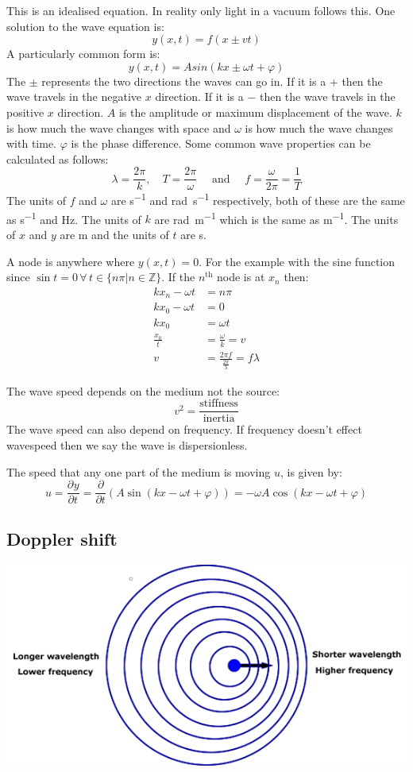 \documentclass{article}
\newcommand{\pd}[3][]{\frac{\partial^{#1}{#2}}{\partial{#3}^{#1}}}
\newcommand{\A}{\forall\,}
\newcommand{\bb}[1]{\mathbb{#1}}
\newcounter{example}[section]
\begin{document}
This is an idealised equation. In reality only light in a vacuum follows this. One solution to the wave equation is:
\[y(x,t)=f(x\pm vt)\]
A particularly common form is:
\[y(x,t)=Asin(kx\pm\omega t+\varphi)\]
The \(\pm\) represents the two directions the waves can go in. If it is a \(+\) then the wave travels in the negative \(x\) direction. If it is a \(-\) then the wave travels in the positive \(x\) direction. \(A\) is the amplitude or maximum displacement of the wave. \(k\) is how much the wave changes with space and \(\omega\) is how much the wave changes with time. \(\varphi\) is the phase difference. Some common wave properties can be calculated as follows:
\[\lambda=\frac{2\pi}{k},\quad T=\frac{2\pi}{\omega}\quad\text{ and }\quad f=\frac{\omega}{2\pi}=\frac 1T\]
The units of \(f\) and \(\omega\) are \si{s^{-1}} and \si{rad.s^{-1}} respectively, both of these are the same as \si{s^{-1}} and \si{Hz}. The units of \(k\) are \si{rad.m^{-1}} which is the same as \si{m^{-1}}. The units of \(x\) and \(y\) are \si{m} and the units of \(t\) are \si{s}.

A node is anywhere where \(y(x,t)=0\). For the example with the sine function since \(\sin t=0\,\A t\in\{n\pi|n\in\bb Z\}\). If the \(n^{\text{th}}\) node is at \(x_n\) then:
\begin{align*}
kx_n-\omega t&=n\pi\\
kx_0-\omega t&=0\\
kx_0&=\omega t\\
\frac{x_0}{t}&=\frac{\omega}{k}=v\\
v&=\frac{2\pi f}{\frac{2\pi}{\lambda}}=f\lambda
\end{align*}

The wave speed depends on the medium not the source:
\[v^2=\frac{\text{stiffness}}{\text{inertia}}\]
The wave speed can also depend on frequency. If frequency doesn't effect wavespeed then we say the wave is dispersionless. 

The speed that any one part of the medium is moving \(u\), is given by:
\[u=\pd yt=\frac{\partial}{\partial t}(A\sin(kx-\omega t+\varphi))=-\omega A\cos(kx-\omega t+\varphi)\]

\subsection*{Doppler shift}

\begin{center}
\includegraphics[scale=0.4]{Doppler}
\end{center}
\end{document}
